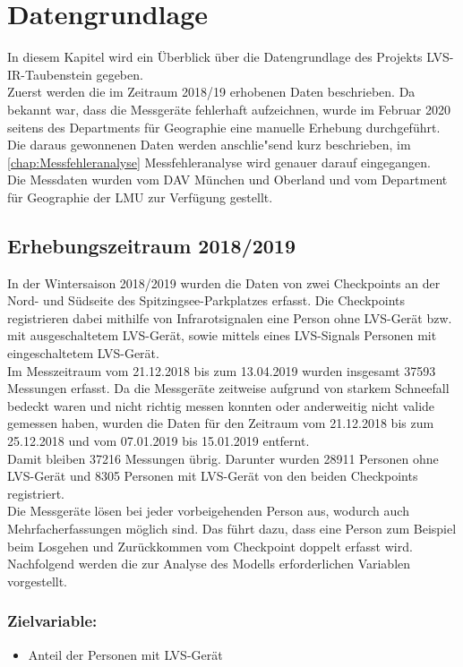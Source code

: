 \documentclass[12pt]{scrreprt}
\begin{document}
\chapter{Datengrundlage}
In diesem Kapitel wird ein Überblick über die Datengrundlage des Projekts LVS-IR-Taubenstein gegeben. \\
Zuerst werden die im Zeitraum 2018/19 erhobenen Daten beschrieben. Da bekannt war, dass die Messgeräte fehlerhaft aufzeichnen, wurde im Februar 2020 seitens des Departments für Geographie eine manuelle Erhebung durchgeführt. Die daraus gewonnenen Daten werden anschlie"send kurz beschrieben, im \autoref{chap:Messfehleranalyse} Messfehleranalyse wird genauer darauf eingegangen. \\
Die Messdaten wurden vom DAV München und Oberland und vom Department für Geographie der LMU zur Verfügung gestellt.

\section{Erhebungszeitraum 2018/2019}
In der Wintersaison 2018/2019 wurden die Daten von zwei Checkpoints an der Nord- und Südseite des Spitzingsee-Parkplatzes erfasst. Die Checkpoints registrieren dabei mithilfe von Infrarotsignalen eine Person ohne LVS-Gerät bzw. mit ausgeschaltetem LVS-Gerät, sowie mittels eines LVS-Signals Personen mit eingeschaltetem LVS-Gerät. \\
Im Messzeitraum vom 21.12.2018 bis zum 13.04.2019 wurden insgesamt 37593 Messungen erfasst. Da die Messgeräte zeitweise aufgrund von starkem Schneefall bedeckt waren und nicht richtig messen konnten oder anderweitig nicht valide gemessen haben, wurden die Daten für den Zeitraum vom 21.12.2018 bis zum 25.12.2018 und vom 07.01.2019 bis 15.01.2019 entfernt. \\
Damit bleiben 37216 Messungen übrig. Darunter wurden 28911 Personen ohne LVS-Gerät und 8305 Personen mit LVS-Gerät von den beiden Checkpoints registriert. \\
Die Messgeräte lösen bei jeder vorbeigehenden Person aus, wodurch auch Mehrfacherfassungen möglich sind. Das führt dazu, dass eine Person zum Beispiel beim Losgehen und Zurückkommen vom Checkpoint doppelt erfasst wird. \\
Nachfolgend werden die zur Analyse des Modells erforderlichen Variablen vorgestellt.
\subsection*{Zielvariable:}
\begin{itemize}
	\item Anteil der Personen mit LVS-Gerät
\end{itemize}
\end{document}
